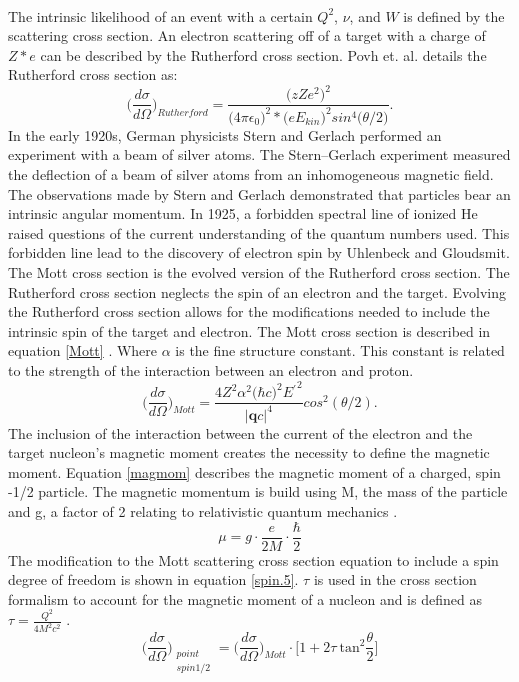 \paragraph{} The intrinsic likelihood of an event with a certain $Q^2$, $\nu$, and $W$ is defined by the scattering cross section. An electron scattering off of a target with a charge of $Z*e$ can be described by the Rutherford cross section. Povh et. al. \cite{PnN} details the Rutherford cross section as:
\begin{equation}
\bigg(\frac{d\sigma}{d\Omega}\bigg)_{Rutherford} = \frac{ \big(zZe^2\big)^2} {\big( 4\pi \epsilon_0\big)^2 * \big(e E_{kin}\big)^2 sin^4\big( \theta / 2 \big) }. 
\end{equation}
In the early 1920s, German physicists Stern and Gerlach performed an experiment with a beam of silver atoms. The Stern–Gerlach experiment measured the deflection of a beam of silver atoms from an inhomogeneous magnetic field\cite{strger}. The observations made by Stern and Gerlach demonstrated that particles bear an intrinsic angular momentum. In 1925, a forbidden spectral line of ionized He raised questions of the current understanding of the quantum numbers used. This forbidden line lead to the discovery of electron spin by Uhlenbeck and Gloudsmit\cite{e_spin}. The Mott cross section is the evolved version of the Rutherford cross section. The Rutherford cross section neglects the spin of an electron and the target. Evolving the Rutherford cross section allows for the modifications needed to include the intrinsic spin of the target and electron. The Mott cross section is described in equation \ref{Mott} \cite{HighE,PnN}.  Where $\alpha$ is the fine structure constant. This constant is related to the strength of the interaction between an electron and proton\cite{sane}.
\begin{equation}
\bigg(\frac{d\sigma}{d\Omega}\bigg)_{Mott} = \frac{4Z^2\alpha^2 \big(\hbar c \big)^2 E{^{\prime} }^2}{ |\boldsymbol{q}c|^4} cos^2 (\theta/2). \label{Mott}
\end{equation}
The inclusion of the interaction between the current of the electron and the target nucleon's magnetic moment creates the necessity to define the magnetic moment. Equation \ref{magmom} describes the magnetic moment of a charged, spin -1/2 particle. The magnetic momentum is build using M, the mass of the particle and g, a factor of 2 relating to relativistic quantum mechanics \cite{PnN}. 
\begin{equation}
\mu = g \cdot \frac{e}{2M}\cdot\frac{\hbar}{2} \label{magmom}
\end{equation}
The modification to the Mott scattering cross section equation to include a spin degree of freedom is shown in equation \ref{spin.5}. $\tau$ is used in the cross section formalism to account for the magnetic moment of a nucleon and is defined as $\tau = \frac{Q^2}{4M^2c^2}$ \cite{PnN}. 
\begin{equation}
\bigg(\frac{d\sigma}{d\Omega}\bigg)_{\substack{point \\ spin 1/2}} = \bigg(\frac{d\sigma}{d\Omega}\bigg)_{Mott} \cdot \big[1 + 2\tau \: \text{tan}^2\frac{\theta}{2} \big]\label{spin.5}
\end{equation}

